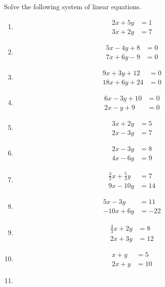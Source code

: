  Solve the following system of linear equations.
 \begin{multicols}{2}
\begin{enumerate}[label=\thesubsection.\arabic*,ref=\thesubsection.\theenumi]
\item 
 \begin{align*}2x+5y&=1\\ 3x+2y&=7\end{align*}
\item \begin{align*}
	5x-4y+8&=0\\ 
      	7x+6y-9&=0
	\end{align*}
\item \begin{align*}
	9x+3y+12&=0\\
	18x+6y+24&=0
	\end{align*}
\item \begin{align*}
        6x-3y+10&=0\\
	2x-y+9&=0
	\end{align*}
	\item \begin{align*}
       		3x+2y&=5 \\
      		2x-3y&=7
    	       \end{align*} 
	\item \begin{align*}
		2x-3y&=8\\
		4x-6y&=9
		\end{align*}
	\item \begin{align*}
		\frac{3}{2}x+\frac{5}{3}y&=7\\
		9x-10y&=14
		\end{align*}
\item \begin{align*}
		5x-3y&=11\\
		-10x+6y&=-22
	\end{align*}
\item \begin{align*}
         \frac{4}{3}x+2y&=8\\
	  2x+3y&=12
	\end{align*}
\item \begin{align*}
	x+y&=5\\
	2x+y&=10
	\end{align*}
\item \begin{align*}

\end{align*}
\end{enumerate}
\end{multicols}
